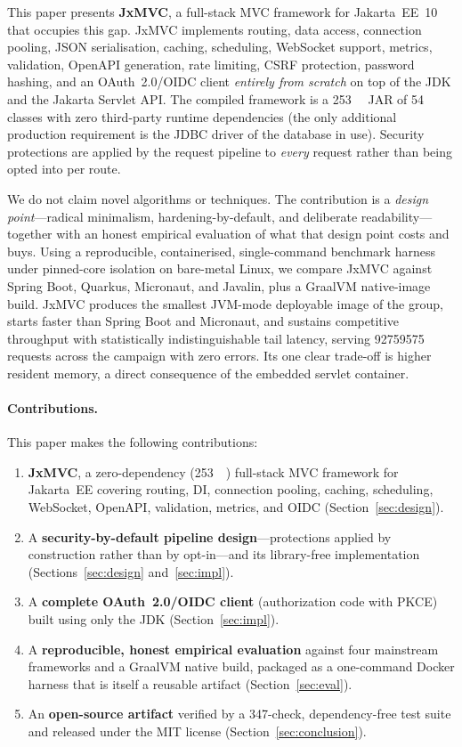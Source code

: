 This paper presents \textbf{JxMVC}, a full-stack MVC framework for
Jakarta~EE~10 that occupies this gap. JxMVC implements routing, data
access, connection pooling, JSON serialisation, caching, scheduling,
WebSocket support, metrics, validation, OpenAPI generation, rate
limiting, CSRF protection, password hashing, and an OAuth~2.0/OIDC
client \emph{entirely from scratch} on top of the JDK and the Jakarta
Servlet API. The compiled framework is a \SI{253}{\kilo\byte} JAR of
54 classes with zero third-party runtime dependencies (the only
additional production requirement is the JDBC driver of the database in
use). Security protections are applied by the request pipeline to
\emph{every} request rather than being opted into per route.

We do not claim novel algorithms or techniques. The contribution is a
\emph{design point}---radical minimalism, hardening-by-default, and
deliberate readability---together with an honest empirical evaluation
of what that design point costs and buys. Using a reproducible,
containerised, single-command benchmark harness under pinned-core
isolation on bare-metal Linux, we compare JxMVC against Spring Boot,
Quarkus, Micronaut, and Javalin, plus a GraalVM native-image build.
JxMVC produces the smallest JVM-mode deployable image of the group,
starts faster than Spring Boot and Micronaut, and sustains competitive
throughput with statistically indistinguishable tail latency, serving
\num{92759575} requests across the campaign with zero errors. Its one
clear trade-off is higher resident memory, a direct consequence of the
embedded servlet container.

\paragraph{Contributions.} This paper makes the following
contributions:
\begin{enumerate}
  \item \textbf{JxMVC}, a zero-dependency (\SI{253}{\kilo\byte})
    full-stack MVC framework for Jakarta~EE covering routing, DI,
    connection pooling, caching, scheduling, WebSocket, OpenAPI,
    validation, metrics, and OIDC (Section~\ref{sec:design}).
  \item A \textbf{security-by-default pipeline design}---protections
    applied by construction rather than by opt-in---and its
    library-free implementation (Sections~\ref{sec:design}
    and~\ref{sec:impl}).
  \item A \textbf{complete OAuth~2.0/OIDC client} (authorization code
    with PKCE) built using only the JDK (Section~\ref{sec:impl}).
  \item A \textbf{reproducible, honest empirical evaluation} against
    four mainstream frameworks and a GraalVM native build, packaged as
    a one-command Docker harness that is itself a reusable artifact
    (Section~\ref{sec:eval}).
  \item An \textbf{open-source artifact} verified by a 347-check,
    dependency-free test suite and released under the MIT license
    (Section~\ref{sec:conclusion}).
\end{enumerate}
